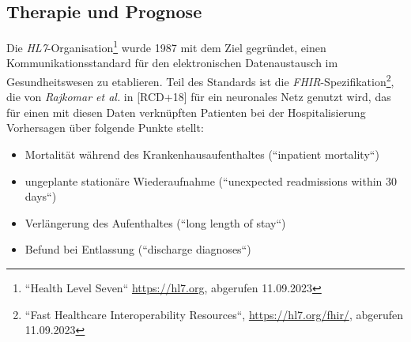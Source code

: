 \subsection{Therapie und Prognose}

Die \textit{HL7}-Organisation\footnote{
    ``Health Level Seven`` \url{https://hl7.org}, abgerufen 11.09.2023
} wurde 1987 mit dem Ziel gegründet, einen Kommunikationsstandard für den elektronischen Datenaustausch im Gesundheitswesen zu etablieren. Teil des Standards ist die \textit{FHIR}-Spezifikation\footnote{
    ``Fast Healthcare Interoperability Resources``, \url{https://hl7.org/fhir/}, abgerufen 11.09.2023
}, die von \textit{Rajkomar et al.} in [RCD+18] für ein neuronales Netz genutzt wird, das für einen mit diesen Daten verknüpften Patienten bei der Hospitalisierung Vorhersagen über folgende Punkte stellt:


\begin{itemize}
    \item Mortalität während des Krankenhausaufenthaltes (``inpatient mortality``)
    \item ungeplante stationäre Wiederaufnahme (``unexpected readmissions within 30 days``)
    \item Verlängerung des Aufenthaltes (``long length of stay``)
    \item Befund bei Entlassung (``discharge diagnoses``)
\end{itemize}


